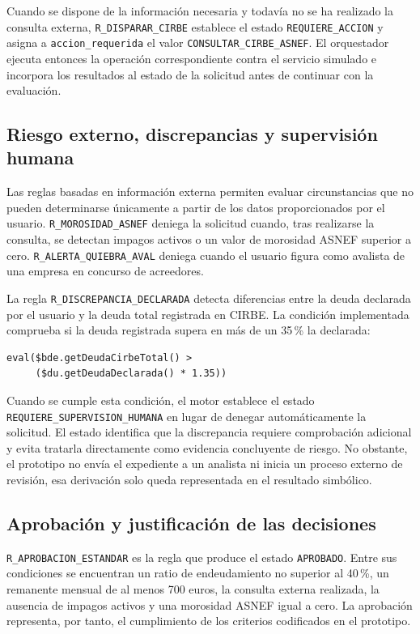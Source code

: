 \documentclass[12pt,a4paper]{report}
\begin{document}
Cuando se dispone de la información necesaria y todavía no se ha realizado la consulta externa, \texttt{R\_DISPARAR\_CIRBE} establece el estado \texttt{REQUIERE\_ACCION} y asigna a \texttt{accion\_requerida} el valor \texttt{CONSULTAR\_CIRBE\_ASNEF}. El orquestador ejecuta entonces la operación correspondiente contra el servicio simulado e incorpora los resultados al estado de la solicitud antes de continuar con la evaluación.

\subsection{Riesgo externo, discrepancias y supervisión humana}

Las reglas basadas en información externa permiten evaluar circunstancias que no pueden determinarse únicamente a partir de los datos proporcionados por el usuario. \texttt{R\_MOROSIDAD\_ASNEF} deniega la solicitud cuando, tras realizarse la consulta, se detectan impagos activos o un valor de morosidad ASNEF superior a cero. \texttt{R\_ALERTA\_QUIEBRA\_AVAL} deniega cuando el usuario figura como avalista de una empresa en concurso de acreedores.

La regla \texttt{R\_DISCREPANCIA\_DECLARADA} detecta diferencias entre la deuda declarada por el usuario y la deuda total registrada en CIRBE. La condición implementada comprueba si la deuda registrada supera en más de un 35\,\% la declarada:

\begin{verbatim}
eval($bde.getDeudaCirbeTotal() >
     ($du.getDeudaDeclarada() * 1.35))
\end{verbatim}

Cuando se cumple esta condición, el motor establece el estado \texttt{REQUIERE\_SUPERVISION\_HUMANA} en lugar de denegar automáticamente la solicitud. El estado identifica que la discrepancia requiere comprobación adicional y evita tratarla directamente como evidencia concluyente de riesgo. No obstante, el prototipo no envía el expediente a un analista ni inicia un proceso externo de revisión, esa derivación solo queda representada en el resultado simbólico.

\subsection{Aprobación y justificación de las decisiones}

\texttt{R\_APROBACION\_ESTANDAR} es la regla que produce el estado \texttt{APROBADO}. Entre sus condiciones se encuentran un ratio de endeudamiento no superior al 40\,\%, un remanente mensual de al menos 700 euros, la consulta externa realizada, la ausencia de impagos activos y una morosidad ASNEF igual a cero. La aprobación representa, por tanto, el cumplimiento de los criterios codificados en el prototipo.
\end{document}
